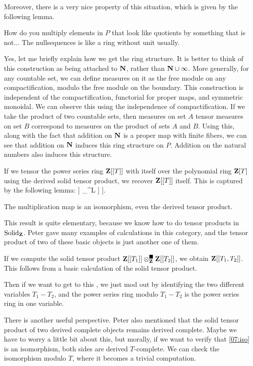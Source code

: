 Moreover, there is a very nice property of this situation, which is given by the following lemma. 


\ques How do you multiply elements in $P$ that look like quotients by something that is not... The nullsequences is like a ring without unit usually.

\ans Yes, let me briefly explain how we get the ring structure. It is better to think of this construction as being attached to $\mathbf N$, rather than $\mathbf N \cup \infty$. More generally, for any countable set, we can define measures on it as the free module on any compactification, modulo the free module on the boundary. This construction is independent of the compactification, functorial for proper maps, and symmetric monoidal. We can observe this using the independence of compactification. If we take the product of two countable sets, then measures on set $A$ tensor measures on set $B$ correspond to measures on the product of sets $A$ and $B$. 
Using this, along with the fact that addition on $\mathbf N$ is a proper map with finite fibers, we can see that addition on $\mathbf N$ induces this ring structure on $P$. Addition on the natural numbers also induces this structure. 


If we tensor the power series ring $\mathbf Z[[T]]$ with itself over the polynomial ring $\mathbf Z[T]$ using the derived solid tensor product, we recover $\mathbf Z[[T]]$ itself. This is captured by the following lemma:
\bl \label{07:iso}
\be
\Z[[T]] \tnsr_{\Z[T]}^{L\solid} \Z[[T]] \iso \Z[[T]].
\ee
\el

The multiplication map is an isomorphism, even the derived tensor product.

This result is quite elementary, because we know how to do tensor products in $\mathrm{Solid}_\mathbf Z$. Peter gave many examples of calculations in this category, and the tensor product of two of these basic objects is just another one of them. 

\begin{sketch}
If we compute the solid tensor product $\mathbf Z[[T_1]] \otimes_{\mathbf Z}^{\blacksquare} \mathbf Z[[T_2]]$, we obtain $\mathbf Z[[T_1, T_2]]$. This follows from a basic calculation of the solid tensor product. 

Then if we want to get to this , we just mod out by identifying the two different variables $T_1 - T_2$, and the power series ring modulo $T_1 - T_2$ is the power series ring in one variable.

There is another useful perspective. Peter also mentioned that the solid tensor product of two derived complete objects remains derived complete. 
Maybe we have to worry a little bit about this, but morally, if we want to verify that \ref{07:iso} is an isomorphism, both sides are derived $T$-complete. We can check the isomorphism modulo $T$, where it becomes a trivial computation.
\end{sketch}

